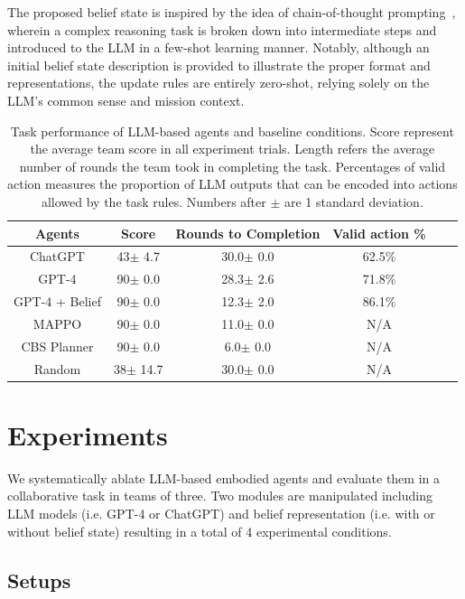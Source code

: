 \documentclass[11pt]{article}
\begin{document}
The proposed belief state is inspired by the idea of chain-of-thought prompting~\cite{wei2022chain}, wherein a complex reasoning task is broken down into intermediate steps and introduced to the LLM in a few-shot learning manner. Notably, although an initial belief state description is provided to illustrate the proper format and representations, the update rules are entirely zero-shot, relying solely on the LLM's common sense and mission context.


\begin{table}[h]
\centering
\begin{tabular}{cccccc}
\hline
\textbf{Agents} & \textbf{Score} & \textbf{Rounds to Completion}& \textbf{Valid action \%}\\
\hline
ChatGPT & 43$\pm$ 4.7 & 30.0$\pm$ 0.0& 62.5\%  \\
GPT-4 & 90$\pm$ 0.0 & 28.3$\pm$ 2.6 & 71.8\% \\
GPT-4 + Belief & 90$\pm$ 0.0 & 12.3$\pm$ 2.0 & 86.1\% \\
MAPPO & 90$\pm$ 0.0 & 11.0$\pm$ 0.0 & N/A\\
CBS Planner & 90$\pm$ 0.0 & 6.0$\pm$ 0.0 & N/A\\
Random &  38$\pm$ 14.7 & 30.0$\pm$ 0.0& N/A\\
\hline
\end{tabular}
\caption{\label{performance_table}
Task performance of LLM-based agents and baseline conditions. Score represent the average team score in all experiment trials. Length refers the average number of rounds the team took in completing the task. Percentages of valid action measures the proportion of LLM outputs that can be encoded into actions allowed by the task rules. Numbers after $\pm$ are 1 standard deviation.
}
\end{table}

\section{Experiments}
We systematically ablate LLM-based embodied agents and evaluate them in a collaborative task in teams of three. Two modules are manipulated including LLM models (i.e. GPT-4 or ChatGPT) and belief representation (i.e. with or without belief state) resulting in a total of 4 experimental conditions. 

\subsection{Setups}
\end{document}
